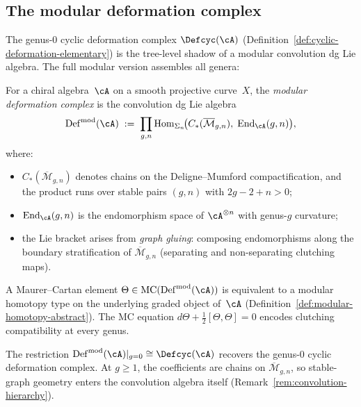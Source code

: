 \subsection{The modular deformation complex}
\label{subsec:modular-deformation-complex}

The genus-$0$ cyclic deformation complex
$\Defcyc(\cA)$ (Definition~\ref{def:cyclic-deformation-elementary})
is the tree-level shadow of a modular convolution dg Lie algebra.
The full modular version assembles all genera:

\begin{definition}
\label{def:modular-deformation-complex}
For a chiral algebra~$\cA$ on a smooth projective curve~$X$, the
\emph{modular deformation complex} is the convolution dg Lie algebra
\begin{equation}\label{eq:modular-deformation-complex}
\operatorname{Def}^{\mathrm{mod}}(\cA)
\;:=\;
\prod_{g,n}
\operatorname{Hom}_{\Sigma_n}\!\bigl(
  C_*(\overline{\mathcal{M}}_{g,n}),\;
  \operatorname{End}_\cA(g,n)
\bigr),
\end{equation}
where:
\begin{itemize}
\item $C_*(\overline{\mathcal{M}}_{g,n})$ denotes chains on the
  Deligne--Mumford compactification, and the product runs over
  stable pairs $(g,n)$ with $2g - 2 + n > 0$;
\item $\operatorname{End}_\cA(g,n)$ is the endomorphism space of
  $\cA^{\otimes n}$ with genus-$g$ curvature;
\item the Lie bracket arises from \emph{graph gluing}: composing
  endomorphisms along the boundary stratification of
  $\overline{\mathcal{M}}_{g,n}$ (separating and non-separating
  clutching maps).
\end{itemize}
A Maurer--Cartan element
$\Theta \in
\operatorname{MC}(\operatorname{Def}^{\mathrm{mod}}(\cA))$ is
equivalent to a modular homotopy type on the underlying graded
object of~$\cA$
(Definition~\ref{def:modular-homotopy-abstract}).
The MC equation
$d\Theta + \frac{1}{2}[\Theta,\Theta] = 0$
encodes clutching compatibility at every genus.
\end{definition}

\begin{remark}
\label{rem:modular-vs-cyclic-complex}
The restriction $\operatorname{Def}^{\mathrm{mod}}(\cA)|_{g=0}
\cong \Defcyc(\cA)$ recovers the genus-$0$ cyclic deformation
complex.  At $g \geq 1$, the coefficients are
chains on $\overline{\mathcal{M}}_{g,n}$, so stable-graph geometry
enters the convolution algebra itself
(Remark~\ref{rem:convolution-hierarchy}).
\end{remark}

